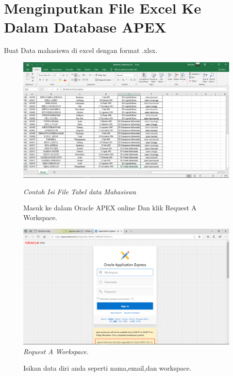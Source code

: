 \chapter{Menginputkan File Excel Ke Dalam Database APEX}

\begin{enumerate}
\item[1]Buat Data mahasiswa di excel dengan format .xlsx.
    \begin{figure}[!htbp]
    \begin{center}
    \includegraphics[scale=0.2]{figures/0.png}
    \caption{\textit{Contoh Isi File Tabel data Mahasiswa}}
    \end{center}   
\item[2]Masuk ke dalam Oracle APEX online Dan klik Request A Workspace.

    \begin{center}
    \includegraphics[scale=0.2]{figures/000.png}
    \caption{\textit{Request A Workspace.}}
    \end{center}
    \end{figure}
\begin{figure}[!htbp]
\item[3]Isikan data diri anda seperti nama,email,dan workspace.


\end{figure}
\end{enumerate}
